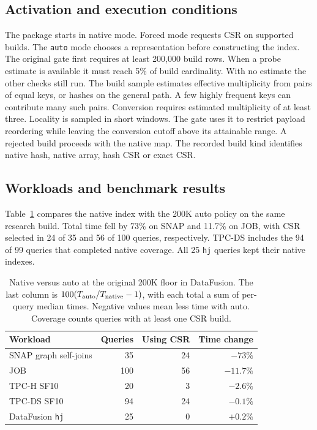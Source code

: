 \documentclass[11pt,a4paper]{article}
\begin{document}
\subsection{Activation and execution conditions}
The package starts in native mode. Forced mode requests CSR on supported builds. The \texttt{auto}
mode chooses a representation before constructing the index. The original gate first requires at
least 200,000 build rows. When a probe estimate is available it must reach 5\% of build
cardinality. With no estimate the other checks still run. The build sample estimates effective
multiplicity from pairs of equal keys, or hashes on the general path. A few highly frequent keys
can contribute many such pairs. Conversion requires estimated multiplicity of at least three.
Locality is sampled in short windows. The gate uses it to restrict payload reordering while
leaving the conversion cutoff above its attainable range. A rejected build proceeds with the
native map. The recorded build kind identifies native hash, native array, hash CSR or exact CSR.

\subsection{Workloads and benchmark results}
Table~\ref{tab:auto} compares the native index with the 200K auto policy on the same research
build. Total time fell by 73\% on SNAP and 11.7\% on JOB, with CSR selected in 24 of 35 and
56 of 100 queries, respectively. TPC-DS includes the 94 of 99 queries that completed native coverage.
All 25 \texttt{hj} queries kept their native indexes.

\begin{table}[htbp]
\caption{Native versus auto at the original 200K floor in DataFusion. The last column is
$100(T_{\rm auto}/T_{\rm native}-1)$, with each total a sum of per-query median times. Negative
values mean less time with auto. Coverage counts queries with at least one CSR
build.}\label{tab:auto}
\centering\small
\begin{tabular*}{.95\linewidth}{@{\extracolsep{\fill}}lrrr@{}}
\toprule Workload & Queries & Using CSR & Time change\\ \midrule
SNAP graph self-joins & 35 & 24 & $-73\%$\\
JOB & 100 & 56 & $-11.7\%$\\
TPC-H SF10 & 20 & 3 & $-2.6\%$\\
TPC-DS SF10 & 94 & 24 & $-0.1\%$\\
DataFusion \texttt{hj} & 25 & 0 & $+0.2\%$\\ \bottomrule
\end{tabular*}
\end{table}
\end{document}
